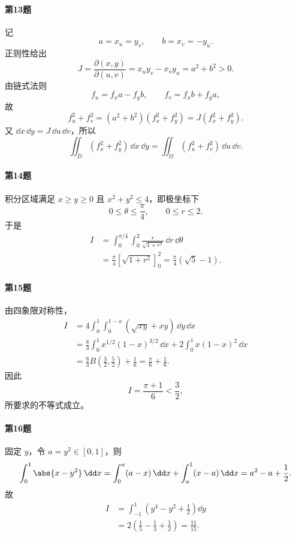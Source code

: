 \paragraph{第13题}
\begin{xsolution}
记
\[
 a=x_u=y_v,
 \qquad b=x_v=-y_u.
\]
正则性给出
\[
 J=\frac{\partial(x,y)}{\partial(u,v)}=x_uy_v-x_vy_u=a^2+b^2>0.
\]
由链式法则
\[
 f_u=f_xa-f_yb,
 \qquad
 f_v=f_xb+f_ya,
\]
故
\[
 f_u^2+f_v^2=(a^2+b^2)(f_x^2+f_y^2)=J(f_x^2+f_y^2).
\]
又 $\dd x\,\dd y=J\,\dd u\,\dd v$，所以
\[
 \iint_D(f_x^2+f_y^2)\,\dd x\,\dd y
 =\iint_\Omega(f_u^2+f_v^2)\,\dd u\,\dd v.
\]
\end{xsolution}

\paragraph{第14题}
\begin{xsolution}
积分区域满足 $x\ge y\ge0$ 且 $x^2+y^2\le4$，即极坐标下
\[
 0\le\theta\le\frac\pi4,
 \qquad0\le r\le2.
\]
于是
\begin{align*}
 I&=\int_0^{\pi/4}\int_0^2\frac{r}{\sqrt{1+r^2}}\,\dd r\,\dd\theta\\
 &=\frac\pi4\left[\sqrt{1+r^2}\right]_0^2
 =\boxed{\frac\pi4(\sqrt5-1)}.
\end{align*}
\end{xsolution}

\paragraph{第15题}
\begin{xsolution}
由四象限对称性，
\begin{align*}
 I&=4\int_0^1\int_0^{1-x}(\sqrt{xy}+xy)\,\dd y\,\dd x\\
 &=\frac83\int_0^1x^{1/2}(1-x)^{3/2}\,\dd x
 +2\int_0^1x(1-x)^2\,\dd x\\
 &=\frac83B\left(\frac32,\frac52\right)+\frac16
 =\frac\pi6+\frac16.
\end{align*}
因此
\[
 I=\frac{\pi+1}{6}<\frac32,
\]
所要求的不等式成立。
\end{xsolution}

\paragraph{第16题}
\begin{xsolution}
固定 $y$，令 $a=y^2\in[0,1]$，则
\[
 \int_0^1\abs{x-y^2}\,\dd x
 =\int_0^a(a-x)\,\dd x+\int_a^1(x-a)\,\dd x
 =a^2-a+\frac12.
\]
故
\begin{align*}
 I&=\int_{-1}^1\left(y^4-y^2+\frac12\right)\dd y\\
 &=2\left(\frac15-\frac13+\frac12\right)
 =\boxed{\frac{11}{15}}.
\end{align*}
\end{xsolution}

